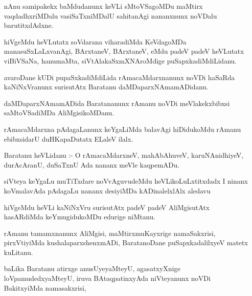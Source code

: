 \documentclass{article}
\begin{document}
\begin{mn}%
nAnu samipakekx baMdudanunx keVLi sMtoVSagoMDu maMtirx vaqdadhxriMDalu vasiSaTxniMDalU 
sahitanAgi nananxnunx noVDalu barutitxdAdxne.
\end{mn}

\begin{mn}%
hiVgeMdu heVLutatx soVdarana viharadiMda KeVdagoMDa manasuSxLaLxvanAgi, BArxtaneV, BArxtaneV,
eMdu padeV padeV heVLutatx viBiVSaNa, hanumaMta, siVtAlakaSxmXNAroMdige puSapxkadiMdiLidanu.
\end{mn}

\begin{mn}%
avaroDane kUDi pupaSxkadiMdiLida rAmacaMdarxnanunx noVDi haSaRda kaNiNxVranunx surisutAtx 
Baratanu daMDaparxNAmamADidanu.
\end{mn}

\begin{mn}%
daMDaparxNAmamADida Baratananunx rAmanu noVDi meVlakekxbibxsi saMtoVSadiMDa AliMgisikoMDanu.
\end{mn}

\begin{mn}%
rAmacaMdarxna pAdagaLanunx keYgaLiMda balavAgi hiDidukoMdu rAmanu ebibxsidarU duHKapaDutatx 
ELaleV ilalx.
\end{mn}

\begin{mn}%
Baratanu heVLidanu :- O rAmacaMdarxneV, mahAbAhuveV, karuNAnidhiyeV, durAcAranU, duSaTxnU 
Ada nananx meVle kaqpemADu.
\end{mn}

\begin{mn}%
siVteya keYgaLu muTiTxdare noVvAguvudeMdu heVLikoLuLxtitxdadx I ninanx koVmalavAda pAdagaLu 
nananx desiyiMDa kADinalelxlAlx aledavu
\end{mn}

\begin{mn}%
hiVgeMdu heVLi kaNiNxVru surisutAtx padeV padeV AliMgisutAtx hasARdiMda keYmugidukoMDu 
edurige niMtanu.
\end{mn}

\begin{mn}%
rAmanu tamamxnanunx AliMgisi, maMtirxmuKayxrige namaSakxrisi, pirxVtiyiMda 
kushalaparxshenxmADi, BaratanoDane puSapxkadalilxyeV matetx kuLitanu.
\end{mn}

\begin{mn}%
baLika Baratanu atirxge anusUyeyaMteyU, agasatxyXnige loVpamudedxyaMteyU, iruva 
BAtaqpatinxyAda niVteyanunx noVDi BakitxyiMda namasakxrisi,
\end{mn}
\end{document}
